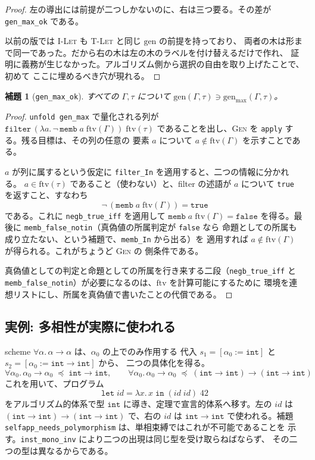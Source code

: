 \documentclass[11pt,a4paper]{ltjsarticle}
\newtheorem{lemma}[theorem]{補題}
\newcommand{\tint}{\mathtt{int}}
\newcommand{\ftv}{\mathrm{ftv}}
\newcommand{\gen}{\mathrm{gen}}
\newcommand{\genmax}{\mathrm{gen}_{\max}}
\newcommand{\inst}{\preceq}
\begin{document}
\begin{proof}
左の導出には前提が二つしかないのに、右は三つ要る。その差が
\texttt{gen\_max\_ok} である。

\medskip
以前の版では \textsc{I-Let} も \textsc{T-Let} と同じ $\gen$ の前提を持っており、
両者の木は形まで同一であった。だから右の木は左の木のラベルを付け替えるだけで作れ、
証明に義務が生じなかった。アルゴリズム側から選択の自由を取り上げたことで、初めて
ここに埋めるべき穴が現れる。
\end{proof}

\begin{lemma}[\texttt{gen\_max\_ok}]
  すべての $\Gamma, \tau$ について $\gen(\Gamma,\tau) \ni \genmax(\Gamma,\tau)$。
\end{lemma}

\begin{proof}
\texttt{unfold gen\_max} で量化される列が
$\mathtt{filter}\,(\lambda a.\,\neg\,\mathtt{memb}\;a\;\ftv(\Gamma))\;\ftv(\tau)$
であることを出し、\textsc{Gen} を \texttt{apply} する。残る目標は、その列の任意の
要素 $a$ について $a \notin \ftv(\Gamma)$ を示すことである。

$a$ が列に属するという仮定に \texttt{filter\_In} を適用すると、二つの情報に分かれる。
$a \in \ftv(\tau)$ であること（使わない）と、filter の述語が $a$ について
\texttt{true} を返すこと、すなわち
\[
  \neg\,(\mathtt{memb}\;a\;\ftv(\Gamma)) = \mathtt{true}
\]
である。これに \texttt{negb\_true\_iff} を適用して
$\mathtt{memb}\;a\;\ftv(\Gamma) = \mathtt{false}$ を得る。最後に
\texttt{memb\_false\_notin}（真偽値の所属判定が \texttt{false} なら
命題としての所属も成り立たない、という補題で、\texttt{memb\_In} から出る）を
適用すれば $a \notin \ftv(\Gamma)$ が得られる。これがちょうど \textsc{Gen} の
側条件である。

真偽値としての判定と命題としての所属を行き来する二段（\texttt{negb\_true\_iff} と
\texttt{memb\_false\_notin}）が必要になるのは、$\ftv$ を計算可能にするために
環境を連想リストにし、所属を真偽値で書いたことの代償である。
\end{proof}

\subsection{実例: 多相性が実際に使われる}

scheme $\forall\alpha.\,\alpha \to \alpha$ は、$\alpha_0$ の上でのみ作用する
代入 $s_1 = [\alpha_0 := \tint]$ と $s_2 = [\alpha_0 := \tint \to \tint]$ から、
二つの具体化を得る。
\[
  \forall\alpha_0.\,\alpha_0 \to \alpha_0 \;\inst\; \tint \to \tint,
  \qquad
  \forall\alpha_0.\,\alpha_0 \to \alpha_0 \;\inst\;
  (\tint \to \tint) \to (\tint \to \tint)
\]
これを用いて、プログラム
\[
  \mathtt{let}\;\mathit{id} = \lambda x.\,x\;\mathtt{in}\;
  (\mathit{id}\;\mathit{id})\;42
\]
をアルゴリズム的体系で型 $\tint$ に導き、定理で宣言的体系へ移す。左の
$\mathit{id}$ は $(\tint \to \tint) \to (\tint \to \tint)$ で、右の
$\mathit{id}$ は $\tint \to \tint$ で使われる。補題
\texttt{selfapp\_needs\_polymorphism} は、単相束縛ではこれが不可能であることを
示す。\texttt{inst\_mono\_inv} により二つの出現は同じ型を受け取らねばならず、
その二つの型は異なるからである。
\end{document}
